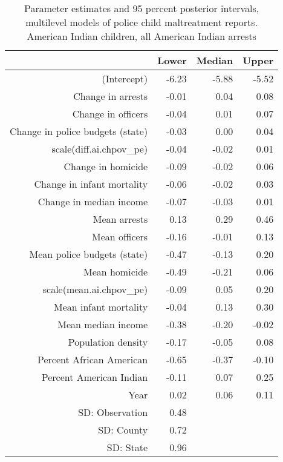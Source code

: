 \begin{table}[ht]
\centering
\begin{tabular}{rrrr}
  \hline
 & Lower & Median & Upper \\ 
  \hline
(Intercept) & -6.23 & -5.88 & -5.52 \\ 
  Change in arrests & -0.01 & 0.04 & 0.08 \\ 
  Change in officers & -0.04 & 0.01 & 0.07 \\ 
  Change in police budgets (state) & -0.03 & 0.00 & 0.04 \\ 
  scale(diff.ai.chpov\_pe) & -0.04 & -0.02 & 0.01 \\ 
  Change in homicide & -0.09 & -0.02 & 0.06 \\ 
  Change in infant mortality & -0.06 & -0.02 & 0.03 \\ 
  Change in median income & -0.07 & -0.03 & 0.01 \\ 
  Mean arrests & 0.13 & 0.29 & 0.46 \\ 
  Mean officers & -0.16 & -0.01 & 0.13 \\ 
  Mean police budgets (state) & -0.47 & -0.13 & 0.20 \\ 
  Mean homicide & -0.49 & -0.21 & 0.06 \\ 
  scale(mean.ai.chpov\_pe) & -0.09 & 0.05 & 0.20 \\ 
  Mean infant mortality & -0.04 & 0.13 & 0.30 \\ 
  Mean median income & -0.38 & -0.20 & -0.02 \\ 
  Population density & -0.17 & -0.05 & 0.08 \\ 
  Percent African American & -0.65 & -0.37 & -0.10 \\ 
  Percent American Indian & -0.11 & 0.07 & 0.25 \\ 
  Year & 0.02 & 0.06 & 0.11 \\ 
  SD: Observation & 0.48 &  &  \\ 
  SD: County & 0.72 &  &  \\ 
  SD: State & 0.96 &  &  \\ 
   \hline
\end{tabular}
\caption{Parameter estimates and 95 percent posterior intervals, multilevel models of 
             police child maltreatment reports. American Indian children, all American Indian arrests} 
\end{table}
